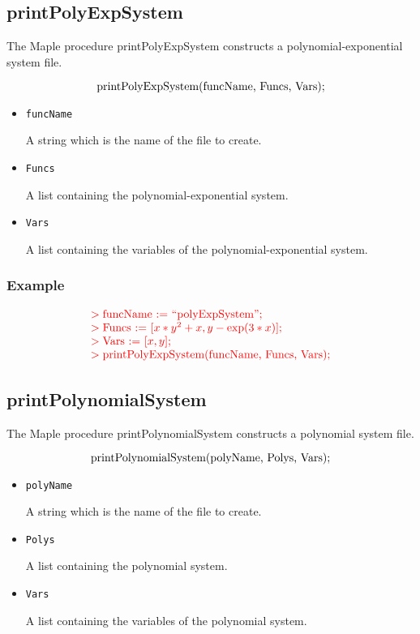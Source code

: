 \documentclass[11pt]{report}
\begin{document}
\subsection{printPolyExpSystem}\label{Sec:PolyExpM}

The Maple procedure printPolyExpSystem constructs a polynomial-exponential system file.

\[
\hbox{printPolyExpSystem(funcName, Funcs, Vars);}
\]

\begin{itemize}

\item {\tt funcName}

A string which is the name of the file to create.

\item {\tt Funcs}

A list containing the polynomial-exponential system.

\item {\tt Vars}

A list containing the variables of the polynomial-exponential system.

\end{itemize}

\subsubsection{Example}

\[
\begin{color}{red}\begin{array}{l}
> \hbox{funcName := ``polyExpSystem'';} \\
> \hbox{Funcs := [$x*y^2 + x, y - \exp(3*x)$];} \\
> \hbox{Vars := [$x,y$];} \\
> \hbox{printPolyExpSystem(funcName, Funcs, Vars);}
\end{array}\end{color}
\]

\subsection{printPolynomialSystem}\label{Sec:PolysM}

The Maple procedure printPolynomialSystem constructs a polynomial system file.

\[
\hbox{printPolynomialSystem(polyName, Polys, Vars);}
\]

\begin{itemize}

\item {\tt polyName}

A string which is the name of the file to create.

\item {\tt Polys}

A list containing the polynomial system.

\item {\tt Vars}

A list containing the variables of the polynomial system.

\end{itemize}
\end{document}

